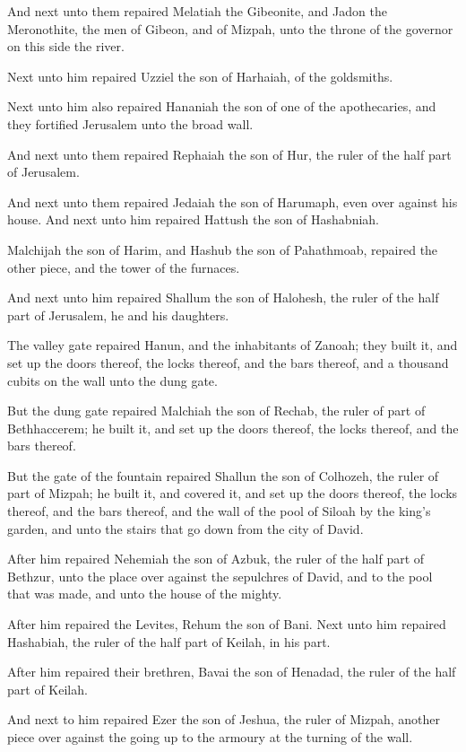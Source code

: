 \Verse And next unto them repaired Melatiah the Gibeonite, and Jadon the Meronothite, the men of Gibeon, and of Mizpah, unto the throne of the governor on this side the river.

\Verse Next unto him repaired Uzziel the son of Harhaiah, of the goldsmiths.

Next unto him also repaired Hananiah the son of one of the apothecaries, and they fortified Jerusalem unto the broad wall.

\Verse And next unto them repaired Rephaiah the son of Hur, the ruler of the half part of Jerusalem.

\Verse And next unto them repaired Jedaiah the son of Harumaph, even over against his house. And next unto him repaired Hattush the son of Hashabniah.

\Verse Malchijah the son of Harim, and Hashub the son of Pahathmoab, repaired the other piece, and the tower of the furnaces.

\Verse And next unto him repaired Shallum the son of Halohesh, the ruler of the half part of Jerusalem, he and his daughters.

\Verse The valley gate repaired Hanun, and the inhabitants of Zanoah; they built it, and set up the doors thereof, the locks thereof, and the bars thereof, and a thousand cubits on the wall unto the dung gate.

\Verse But the dung gate repaired Malchiah the son of Rechab, the ruler of part of Bethhaccerem; he built it, and set up the doors thereof, the locks thereof, and the bars thereof.

\Verse But the gate of the fountain repaired Shallun the son of Colhozeh, the ruler of part of Mizpah; he built it, and covered it, and set up the doors thereof, the locks thereof, and the bars thereof, and the wall of the pool of Siloah by the king's garden, and unto the stairs that go down from the city of David.

\Verse After him repaired Nehemiah the son of Azbuk, the ruler of the half part of Bethzur, unto the place over against the sepulchres of David, and to the pool that was made, and unto the house of the mighty.

\Verse After him repaired the Levites, Rehum the son of Bani. Next unto him repaired Hashabiah, the ruler of the half part of Keilah, in his part.

\Verse After him repaired their brethren, Bavai the son of Henadad, the ruler of the half part of Keilah.

\Verse And next to him repaired Ezer the son of Jeshua, the ruler of Mizpah, another piece over against the going up to the armoury at the turning of the wall.

